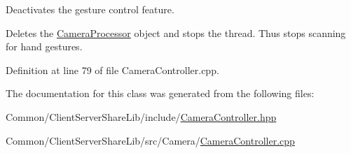 Deactivates the gesture control feature. 

Deletes the \hyperlink{class_camera_processor}{Camera\+Processor} object and stops the thread. Thus stops scanning for hand gestures. 

Definition at line 79 of file Camera\+Controller.\+cpp.



The documentation for this class was generated from the following files\+:\begin{DoxyCompactItemize}
\item 
Common/\+Client\+Server\+Share\+Lib/include/\hyperlink{_camera_controller_8hpp}{Camera\+Controller.\+hpp}\item 
Common/\+Client\+Server\+Share\+Lib/src/\+Camera/\hyperlink{_camera_controller_8cpp}{Camera\+Controller.\+cpp}\end{DoxyCompactItemize}
